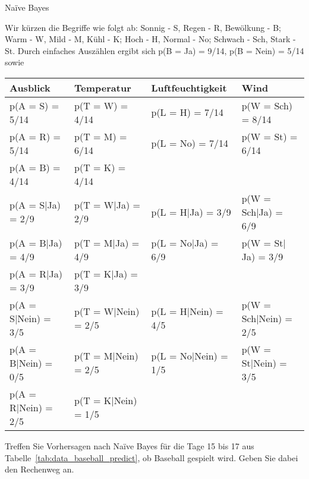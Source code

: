\begin{task}[credit=19]{Na\"ive Bayes}
\begin{subtask}[title=Wahrscheinlichkeiten,points=6]
\begin{solution}
Wir kürzen die Begriffe wie folgt ab: Sonnig - S, Regen - R, Bewölkung - B; Warm - W, Mild - M, Kühl - K; Hoch - H, Normal - No; Schwach - Sch, Stark - St. Durch einfaches Auszählen ergibt sich p(B = Ja) = 9/14, p(B = Nein) = 5/14 sowie
\begin{tabular}{l|l|l|l}
	Ausblick & Temperatur & Luftfeuchtigkeit & Wind \\ \hline
p(A = S) = 5/14 & p(T = W) = 4/14 & p(L = H) = 7/14 & p(W = Sch) = 8/14 \\
p(A = R) = 5/14 & p(T = M) = 6/14 & p(L = No) = 7/14 & p(W = St) = 6/14 \\
p(A = B) = 4/14 & p(T = K) = 4/14 &                 &                    \\ 
p(A = S|Ja) = 2/9 & p(T = W|Ja) = 2/9 & p(L = H|Ja) = 3/9 & p(W = Sch|Ja) = 6/9 \\
p(A = B|Ja) = 4/9 & p(T = M|Ja) = 4/9 & p(L = No|Ja) = 6/9 & p(W = St| Ja) = 3/9 \\
p(A = R|Ja) = 3/9 & p(T = K|Ja) = 3/9 &                   &                     \\ 
p(A = S|Nein) = 3/5 & p(T = W|Nein) = 2/5 & p(L = H|Nein) = 4/5 & p(W = Sch|Nein) = 2/5 \\
p(A = B|Nein) = 0/5 & p(T = M|Nein) = 2/5 & p(L = No|Nein) = 1/5 & p(W = St|Nein) = 3/5  \\
p(A = R|Nein) = 2/5 & p(T = K|Nein) = 1/5 &                     &                       
\end{tabular} 
\end{solution}

\end{subtask}

\begin{subtask}[points=9,title=Vorhersage]
Treffen Sie Vorhersagen nach Na\"ive Bayes für die Tage 15 bis 17 aus Tabelle~\ref{tab:data_baseball_predict}, ob Baseball gespielt wird.
Geben Sie dabei den Rechenweg an.


\end{subtask}
\end{task}
